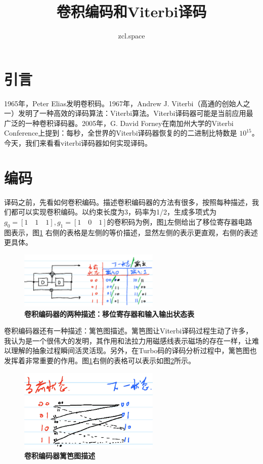 \documentclass[10pt,a4paper,UTF8]{article}
\author{zcl.space}
\date{}
\title{卷积编码和Viterbi译码}
\begin{document}
\maketitle
\tableofcontents



\section{引言}
\label{sec:orgheadline1}


1965年，Peter Elias发明卷积码。1967年，Andrew J. Viterbi（高通的创始人之一）发明了一种高效的译码算法：Viterbi算法。Viterbi译码器可能是当前应用最广泛的一种卷积译码器。2005年，G. David Forney在南加州大学的Viterbi Conference上提到：每秒，全世界的Viterbi译码器恢复的的二进制比特数是 \(10^{15}\)。今天，我们来看看viterbi译码器如何实现译码。

\section{编码}
\label{sec:orgheadline2}


译码之前，先看如何卷积编码。描述卷积编码器的方法有很多，按照每种描述，我们都可以实现卷积编码。以约束长度为3，码率为1/2，生成多项式为 \(g_{0} = [1\quad 1\quad 1],g_{1}=[1  \quad 0 \quad 1]\)的卷积码为例，图\ref{fig:orgparagraph1}左侧给出了移位寄存器电路图表示，图\ref{fig:orgparagraph1} 右侧的表格是左侧的等价描述，显然左侧的表示更直观，右侧的表述更具体。

\begin{figure}[htb]
\centering
\includegraphics[width=0.6\textwidth]{../../img/20160101convolutionalEncoder.jpg}
\caption{\label{fig:orgparagraph1}
\textbf{卷积编码器的两种描述：移位寄存器和输入输出状态表}}
\end{figure}

卷积编码器还有一种描述：篱笆图描述。篱笆图让Viterbi译码过程生动了许多，我认为是一个很伟大的发明，其作用和法拉力用磁感线表示磁场的存在一样，让难以理解的抽象过程瞬间活灵活现。另外，在Turbo码的译码分析过程中，篱笆图也发挥着非常重要的作用。图\ref{fig:orgparagraph1}右侧的表格可以表示如图\ref{fig:orgparagraph2}所示。

\begin{figure}[htb]
\centering
\includegraphics[width=0.6\textwidth]{../../img/20160101convolutionalEncoderTrellis.jpg}
\caption{\label{fig:orgparagraph2}
\textbf{卷积编码器篱笆图描述}}
\end{figure}
\end{document}
